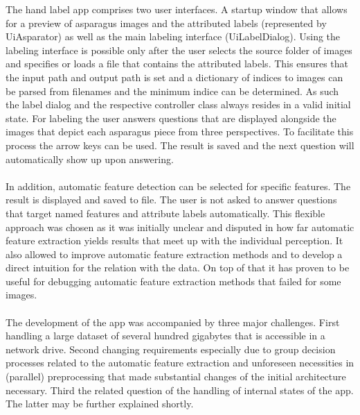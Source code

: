 The hand label app comprises two user interfaces. A startup window that allows for a preview of asparagus images and the attributed labels (represented by Ui\textunderscore Asparator) as well as the main labeling interface (Ui\textunderscore LabelDialog). Using the labeling interface is possible only after the user selects the source folder of images and specifies or loads a file that contains the attributed labels. This ensures that the input path and output path is set and a dictionary of indices to images can be parsed from filenames and the minimum indice can be determined. As such the label dialog and the respective controller class always resides in a valid initial state. For labeling the user answers questions that are displayed alongside the images that depict each asparagus piece from three perspectives. To facilitate this process the arrow keys can be used. The result is saved and the next question will automatically show up upon answering. \\
\\
In addition, automatic feature detection can be selected for specific features. The result is displayed and saved to file. The user is not asked to answer questions that target named features and attribute labels automatically. This flexible approach was chosen as it was initially unclear and disputed in how far automatic feature extraction yields results that meet up with the individual perception. It also allowed to improve automatic feature extraction methods and to develop a direct intuition for the relation with the data. On top of that it has proven to be useful for debugging automatic feature extraction methods that failed for some images. \\
\\
The development of the app was accompanied by three major challenges. First handling a large dataset of several hundred gigabytes that is accessible in a network drive. Second changing requirements especially due to group decision processes related to the automatic feature extraction and unforeseen necessities in (parallel) preprocessing that made substantial changes of the initial architecture necessary. Third the related question of the handling of internal states of the app. The latter may be further explained shortly. \\
\\
